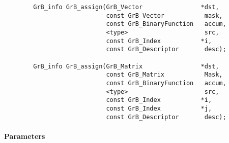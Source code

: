 \begin{verbatim}
        GrB_info GrB_assign(GrB_Vector                *dst,
                            const GrB_Vector           mask,
                            const GrB_BinaryFunction   accum,
                            <type>                     src,
                            const GrB_Index           *i,
                            const GrB_Descriptor       desc);

        GrB_info GrB_assign(GrB_Matrix                *dst,
                            const GrB_Matrix           Mask,
                            const GrB_BinaryFunction   accum,
                            <type>                     src,
                            const GrB_Index           *i,
                            const GrB_Index           *j,
                            const GrB_Descriptor       desc);
\end{verbatim}

\paragraph{Parameters}

